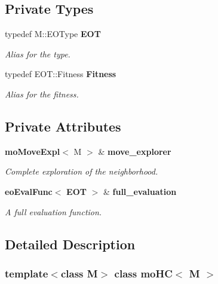 \subsection*{Private Types}
\begin{CompactItemize}
\item 
typedef M::EOType {\bf EOT}\label{classmo_h_c_y0}

\begin{CompactList}\small\item\em Alias for the type. \item\end{CompactList}\item 
typedef EOT::Fitness {\bf Fitness}\label{classmo_h_c_y1}

\begin{CompactList}\small\item\em Alias for the fitness. \item\end{CompactList}\end{CompactItemize}
\subsection*{Private Attributes}
\begin{CompactItemize}
\item 
{\bf mo\-Move\-Expl}$<$ M $>$ \& {\bf move\_\-explorer}\label{classmo_h_c_r0}

\begin{CompactList}\small\item\em Complete exploration of the neighborhood. \item\end{CompactList}\item 
{\bf eo\-Eval\-Func}$<$ {\bf EOT} $>$ \& {\bf full\_\-evaluation}\label{classmo_h_c_r1}

\begin{CompactList}\small\item\em A full evaluation function. \item\end{CompactList}\end{CompactItemize}


\subsection{Detailed Description}
\subsubsection*{template$<$class M$>$ class mo\-HC$<$ M $>$}

